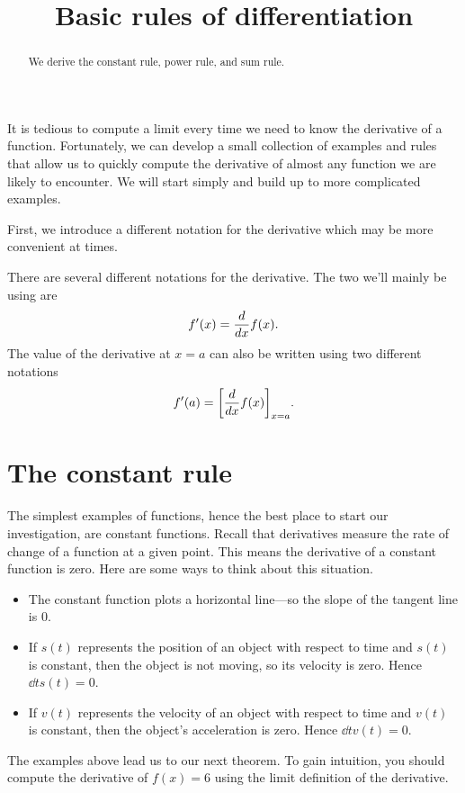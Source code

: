 \documentclass{ximera}
\title[Dig-In:]{Basic rules of differentiation}
\begin{document}
\begin{abstract}
  We derive the constant rule, power rule, and sum rule. 
\end{abstract}
\maketitle

It is tedious to compute a limit every time we need to know the
derivative of a function.  Fortunately, we can develop a small
collection of examples and rules that allow us to quickly compute the
derivative of almost any function we are likely to encounter.  We will
start simply and build up to more complicated examples.

First, we introduce a different notation for the derivative which may be more convenient at times.
\begin{definition}
	  There are several different notations for the derivative.  The two we'll mainly be using are
	   \[ f'(x)= \frac{d}{\mathop{}\!d x} f(x). \]
	  The value of the derivative at $x=a$ can also be written using two different notations
	  \[ f'(a)= \bigg[ \frac{d}{\mathop{}\!d x} f(x) \bigg]_{x=a}.  \]
\end{definition}




\section{The constant rule}

The simplest examples of functions, hence the best place to start our
investigation, are constant functions.  Recall that derivatives
measure the rate of change of a function at a given point. This means the
derivative of a constant function is zero. Here are some ways to think about
this situation.
\begin{itemize}
	\item The constant function plots a horizontal line---so the slope of
		  the tangent line is $0$.
	\item If $s(t)$ represents the position of an object with respect to
		  time and $s(t)$ is constant, then the object is not moving, so its velocity is zero. Hence $\dd{t} s(t) = 0$.
	\item If $v(t)$ represents the velocity of an object with respect to
		  time and $v(t)$ is constant, then the object's acceleration is zero. Hence $\dd{t} v(t) = 0$.
\end{itemize}
The examples above lead us to our next theorem.
To gain intuition, you should compute the derivative of $f(x) = 6$ using the limit definition of the derivative.
\end{document}
